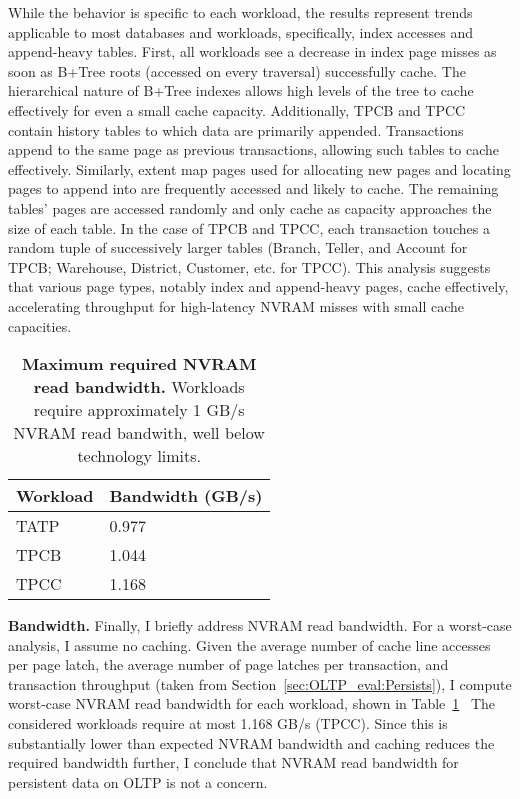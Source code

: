While the behavior is specific to each workload, the results represent trends applicable to most databases and workloads, specifically, index accesses and append-heavy tables.
First, all workloads see a decrease in index page misses as soon as B+Tree roots (accessed on every traversal) successfully cache.
The hierarchical nature of B+Tree indexes allows high levels of the tree to cache effectively for even a small cache capacity.
Additionally, TPCB and TPCC contain history tables to which data are primarily appended.
Transactions append to the same page as previous transactions, allowing such tables to cache effectively.
Similarly, extent map pages used for allocating new pages and locating pages to append into are frequently accessed and likely to cache.
The remaining tables' pages are accessed randomly and only cache as capacity approaches the size of each table.
In the case of TPCB and TPCC, each transaction touches a random tuple of successively larger tables (Branch, Teller, and Account for TPCB; Warehouse, District, Customer, etc. for TPCC).
This analysis suggests that various page types, notably index and append-heavy pages, cache effectively, accelerating throughput for high-latency NVRAM misses with small cache capacities.

\begin{table}
  \centering
  \begin{tabular}{l l}
    \hline
    Workload & Bandwidth (GB/s) \\
    \hline \hline
    TATP & 0.977 \\
    TPCB & 1.044 \\
    TPCC & 1.168 \\
    \hline
  \end{tabular}
  \caption{\textbf{Maximum required NVRAM read bandwidth.} Workloads require approximately 1 GB/s NVRAM read bandwith, well below technology limits.}
  \label{table::ReadBandwidth}
\end{table}

\textbf{Bandwidth.}
Finally, I briefly address NVRAM read bandwidth.
For a worst-case analysis, I assume no caching.
Given the average number of cache line accesses per page latch, the average number of page latches per transaction, and transaction throughput (taken from Section~\ref{sec:OLTP_eval:Persists}), I compute worst-case NVRAM read bandwidth for each workload, shown in Table~\ref{table::ReadBandwidth}~
The considered workloads require at most 1.168 GB/s (TPCC).
Since this is substantially lower than expected NVRAM bandwidth and caching reduces the required bandwidth further, I conclude that NVRAM read bandwidth for persistent data on OLTP is not a concern.

